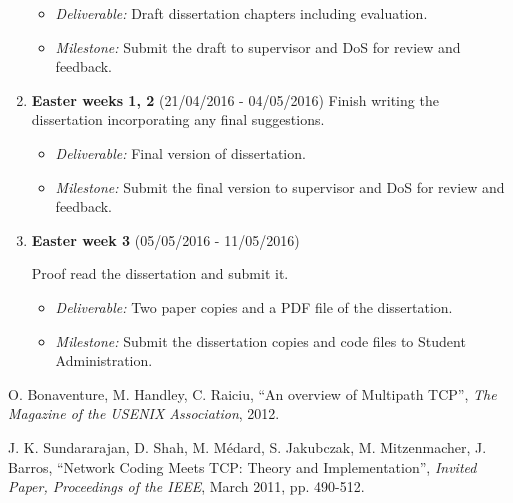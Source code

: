 \documentclass[12pt,a4paper,twoside]{article}
\begin{document}
\begin{enumerate}
\begin{itemize}
  \item {\em Deliverable:} Draft dissertation chapters including evaluation.
  \item {\em Milestone:} Submit the draft to supervisor and DoS for review and feedback.
\end{itemize}

\item {\bf Easter weeks 1, 2} (21/04/2016 - 04/05/2016)
Finish writing the dissertation incorporating any final suggestions. 

\begin{itemize}
  \item {\em Deliverable:} Final version of dissertation. 
  \item {\em Milestone:} Submit the final version to supervisor and DoS for review and feedback. 
\end{itemize}

\item {\bf Easter week 3} (05/05/2016 - 11/05/2016)

Proof read the dissertation and submit it. 
\begin{itemize}
  \item {\em Deliverable:} Two paper copies and a PDF file of the dissertation.
  \item {\em Milestone:} Submit the dissertation copies and code files to Student Administration.
\end{itemize}

\end{enumerate}


\begin{thebibliography}{9}

  O. Bonaventure, M. Handley, C. Raiciu,
  ``An overview of Multipath TCP'',
  \emph{The Magazine of the USENIX Association},
  2012.

  J. K. Sundararajan, D. Shah, M. Médard, S. Jakubczak, M. Mitzenmacher, J. Barros,
  ``Network Coding Meets TCP: Theory and Implementation'',
  \emph{Invited Paper, Proceedings of the IEEE},
  March 2011,
  pp. 490-512.

\end{thebibliography}
\end{document}
